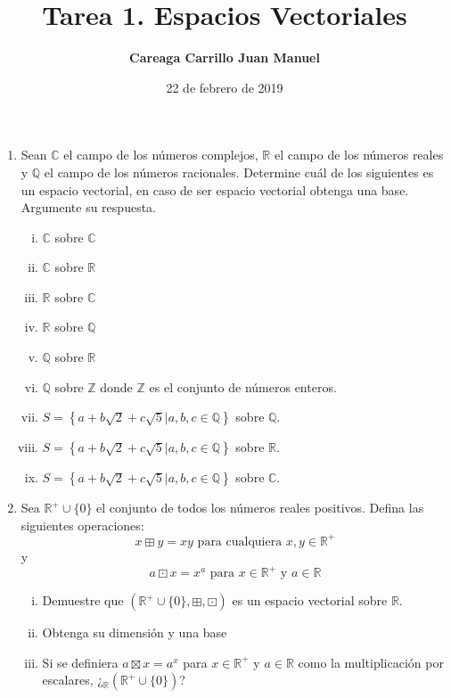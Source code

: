 \documentclass{article}
\begin{document}
    \title{Tarea 1. Espacios Vectoriales}
    \author{\bf Careaga Carrillo Juan Manuel}
    \date{22 de febrero de 2019}
    \maketitle
    
    \begin{enumerate}
        \item Sean $\mathbb{C}$ el campo de los números complejos, $\mathbb{R}$
        el campo de los números reales y $\mathbb{Q}$ el campo de los números
        racionales. Determine cuál de los siguientes es un espacio vectorial,
        en caso de ser espacio vectorial obtenga una base. Argumente su
        respuesta.
        \begin{enumerate}[i.]
            \item {
                $\mathbb{C}$ sobre $\mathbb{C}$
            }
            \item {
                $\mathbb{C}$ sobre $\mathbb{R}$
            }
            \item {
                $\mathbb{R}$ sobre $\mathbb{C}$
            }
            \item {
                $\mathbb{R}$ sobre $\mathbb{Q}$
            }
            \item {
                $\mathbb{Q}$ sobre $\mathbb{R}$
            }
            \item {
                $\mathbb{Q}$ sobre $\mathbb{Z}$ donde $\mathbb{Z}$ es el conjunto de números enteros.
            }
            \item {
                $S=\left\{a+b\sqrt{2}+c\sqrt{5}\big\vert a,b,c\in\mathbb{Q}\right\}$ sobre $\mathbb{Q}$.
            }
            \item {
                $S=\left\{a+b\sqrt{2}+c\sqrt{5}\big\vert a,b,c\in\mathbb{Q}\right\}$ sobre $\mathbb{R}$.
            }
            \item {
                $S=\left\{a+b\sqrt{2}+c\sqrt{5}\big\vert a,b,c\in\mathbb{Q}\right\}$ sobre $\mathbb{C}$.
            }
        \end{enumerate}

        \item Sea $\mathbb{R}^+\cup\{0\}$ el conjunto de todos los números reales positivos. Defina las siguientes operaciones:
        $$x\boxplus y=xy \text{ para cualquiera } x,y\in\mathbb{R}^+$$ y
        $$a\boxdot x=x^a \text{ para } x\in\mathbb{R}^+ \text{ y } a\in\mathbb{R}$$
        \begin{enumerate}[i.]
            \item {
                Demuestre que $(\mathbb{R}^+\cup\{0\},\boxplus,\boxdot)$ es un espacio vectorial sobre $\mathbb{R}$.
            }
            \item {
                Obtenga su dimensión y una base
            }
            \item {
                Si se definiera $a\boxtimes x=a^x$ para $x\in\mathbb{R}^+$ y $a\in\mathbb{R}$ como la multiplicación por escalares, ¿$_\mathbb{R}(\mathbb{R}^+\cup\{0\})$?
            }
        \end{enumerate}


\end{enumerate}
\end{document}
